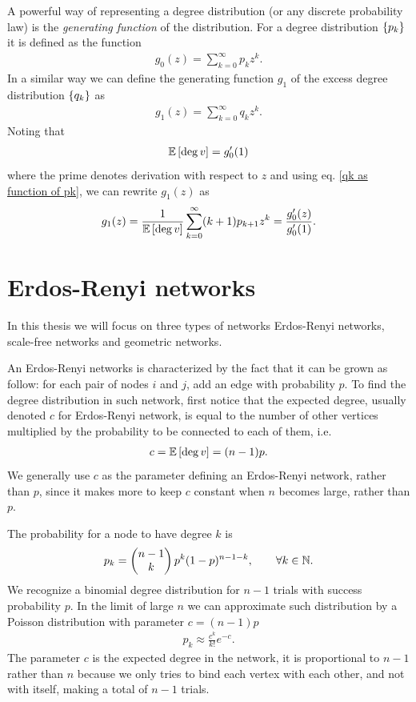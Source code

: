 \documentclass[
11pt, %
english, %
singlespacing, %
nolistspacing, %
liststotoc, %
headsepline, %
]{MastersDoctoralThesis} %
\begin{document}
A powerful way of representing a degree distribution (or any discrete probability law) is the \emph{generating function} of the distribution. For a degree distribution $\{p_k\}$ it is defined as the function
\begin{align}
	g_0(z) = \sum_{k=0}^\infty p_k z^k. \label{Definition of g0}
\end{align}
In a similar way we can define the generating function $g_1$ of the excess degree distribution $\{q_k\}$ as
\begin{align}
	g_1(z) = \sum_{k=0}^\infty q_k z^k. \label{Definition of g1}
\end{align}
Noting that
\begin{align}
	\mathbb{E}\left[ \deg{v} \right] = g'_0(1) \label{Expectation value as g'0(1)}
\end{align}
where the prime denotes derivation with respect to $z$ and using eq. \eqref{qk as function of pk}, we can rewrite $g_1(z)$ as
\begin{align}
	g_1(z) = \frac{1}{\mathbb{E}\left[ \deg{v} \right]} \sum_{k=0}^\infty (k + 1) p_{k + 1} z^k = \frac{g'_0(z)}{g'_0(1)}. \label{g1 as a function of g0}
\end{align}

\section{Erdos-Renyi networks}

In this thesis we will focus on  three types of networks Erdos-Renyi networks, scale-free networks and geometric networks.

An Erdos-Renyi networks is characterized by the fact that it can be grown as follow: for each pair of nodes $i$ and $j$, add an edge with probability $p$. To find the degree distribution in such network, first notice that the expected degree, usually denoted $c$ for Erdos-Renyi network, is equal to the number of other vertices multiplied by the probability to be connected to each of them, i.e.
\begin{align}
	c = \mathbb{E}\left[ \deg{v} \right] = (n - 1) p.
\end{align}
We generally use $c$ as the parameter defining an Erdos-Renyi network, rather than $p$, since it makes more to keep $c$ constant when $n$ becomes large, rather than $p$. 

The probability for a node to have degree $k$ is
\begin{align}
	p_k = \begin{pmatrix} n-1 \\ k \end{pmatrix} p^k (1 - p)^{n - 1 - k}, \qquad \forall k \in \mathbb{N}. \label{Poisson degree distribution}
\end{align}
We recognize a binomial degree distribution for $n-1$ trials with success probability $p$. In the limit of large $n$ we can approximate such distribution by a Poisson distribution with parameter $c = (n - 1) p$
\begin{align}
	p_k \approx \frac{c^k}{k!} e^{-c}.
\end{align}
The parameter $c$ is the expected degree in the network, it is proportional to $n - 1$ rather than $n$ because we only tries to bind each vertex with each other, and not with itself, making a total of $n-1$ trials.
\end{document}
